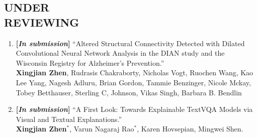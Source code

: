 \documentclass[margin]{res}
\begin{document}
\begin{resume}
\vspace{-2em}                
\section{UNDER\\ REVIEWING}
				\begin{enumerate}[noitemsep,wide=0pt,leftmargin=\dimexpr\labelwidth + 2\labelsep\relax]\itemsep -0.0pt
				\setcounter{enumi}{6}
				\item \textbf{[\emph{In submission}]} ``Altered Structural Connectivity Detected with Dilated Convolutional Neural Network Analysis in the DIAN study and the Wisconsin Registry for Alzheimer's Prevention.''\\
                            \textbf{Xingjian Zhen}, Rudrasis Chakraborty, Nicholas Vogt, Ruochen Wang, Kao Lee Yang, Nagesh Adluru, Brian Gordon, Tammie Benzinger, Nicole Mckay, Tobey Betthauser, Sterling C, Johnson, Vikas Singh, Barbara B. Bendlin
                \item \textbf{[\emph{In submission}]} ``A First Look: Towards Explainable TextVQA Models via Visual and Textual Explanations.''\\
                            \textbf{Xingjian Zhen}$^*$, Varun Nagaraj Rao$^*$, Karen Hovsepian, Mingwei Shen.
                \end{enumerate}

\vspace{-1em}

\end{resume}
\end{document}
